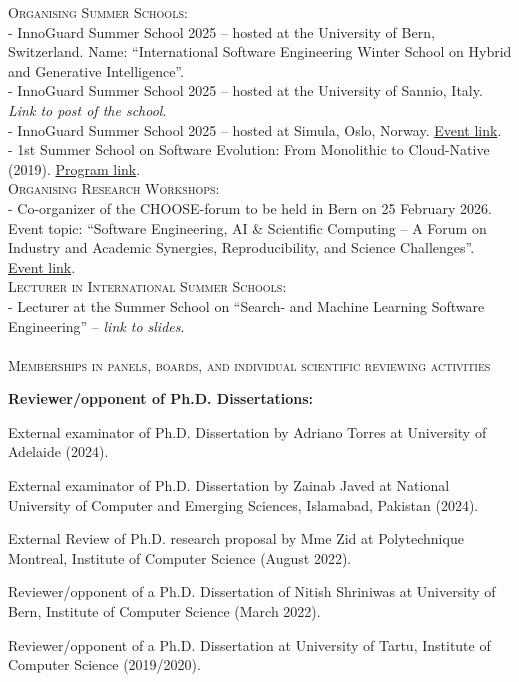 \documentclass[11pt]{article}
\begin{document}
\textsc{Organising Summer Schools:}
\medskip \\
- InnoGuard Summer School 2025 – hosted at the University of Bern, Switzerland. Name: ``International Software Engineering Winter School on Hybrid and Generative Intelligence''.\\
- InnoGuard Summer School 2025 – hosted at the University of Sannio, Italy. \textit{Link to post of the school}.\\
- InnoGuard Summer School 2025 – hosted at Simula, Oslo, Norway. \href{https://www.simula.no/about/news/next-generation-innovators-inside-2025-innoguard-summer-school}{Event link}.\\
- 1st Summer School on Software Evolution: From Monolithic to Cloud-Native (2019). \href{https://inforte.jyu.fi/events/SW_evolution}{Program link}.\\


\textsc{Organising Research Workshops:}
\medskip \\ 
- Co-organizer of the CHOOSE-forum to be held in Bern on 25 February 2026. Event topic: ``Software Engineering, AI \& Scientific Computing -- A Forum on Industry and Academic Synergies, Reproducibility, and Science Challenges''. \href{https://se2026.inf.unibe.ch/en/choose-forum/}{Event link}.\\


\textsc{Lecturer in International Summer Schools:}
\medskip \\
- Lecturer at the Summer School on ``Search- and Machine Learning Software Engineering'' – \textit{link to slides}.\\

\medskip\medskip \\
\textsc{Memberships in panels, boards, and individual scientific reviewing activities}

\medskip 

\textbf{Reviewer/opponent of Ph.D. Dissertations:}
\begin{innerlist}
   \item External examinator of Ph.D. Dissertation by Adriano Torres at University of Adelaide (2024).
   \item External examinator of Ph.D. Dissertation by Zainab Javed at National University of Computer and Emerging Sciences, Islamabad, Pakistan (2024).
   \item External Review of Ph.D. research proposal by Mme Zid at Polytechnique Montreal, Institute of Computer Science (August 2022).
   \item Reviewer/opponent of a Ph.D. Dissertation of Nitish Shriniwas at University of Bern, Institute of Computer Science (March 2022).
   \item Reviewer/opponent of a Ph.D. Dissertation at University of Tartu, Institute of Computer Science (2019/2020).
\end{innerlist}
\end{document}
